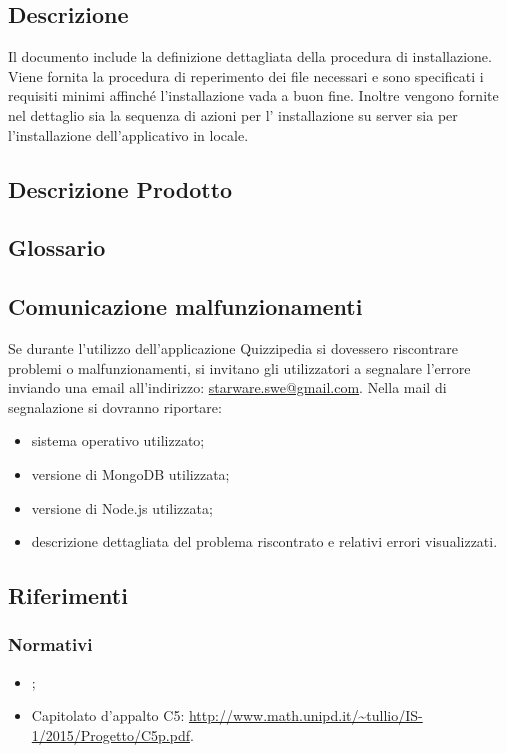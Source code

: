 \documentclass[12pt,a4paper]{article}
\begin{document}
	\subsection{Descrizione}
    Il documento include la definizione dettagliata della procedura di installazione. Viene fornita la procedura di reperimento dei file necessari e sono specificati i requisiti minimi affinché l'installazione vada a buon fine.
    Inoltre vengono fornite nel dettaglio sia la sequenza di azioni per l' installazione su server  sia per l'installazione dell'applicativo in locale.
   
	
	\subsection{Descrizione Prodotto}
	\descrizioneProdotto
	
	\subsection{Glossario}
	\glossarioManualiPrint
	\subsection{Comunicazione malfunzionamenti}
		Se durante l’utilizzo dell’applicazione Quizzipedia si dovessero riscontrare problemi o malfunzionamenti, si invitano gli utilizzatori a segnalare l’errore inviando una email all’indirizzo:
		\url{starware.swe@gmail.com}. Nella mail di segnalazione si dovranno riportare:
		\begin{itemize}
			\item sistema operativo utilizzato;
			\item versione di MongoDB utilizzata;
			\item versione di Node.js utilizzata;
			\item descrizione dettagliata del problema riscontrato e relativi errori visualizzati.
		\end{itemize}
	\subsection{Riferimenti}
	
	\subsubsection{Normativi}
	\begin{itemize}
		\item \NdPv{};
		\item Capitolato d'appalto C5: \url{http://www.math.unipd.it/~tullio/IS-1/2015/Progetto/C5p.pdf}.
	\end{itemize}	
\end{document}
